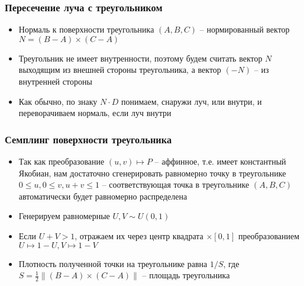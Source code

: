 \documentclass[10pt]{beamer}
\begin{document}
\begin{frame}
\frametitle{Пересечение луча с треугольником}
\begin{itemize}
\item Нормаль к поверхности треугольника \begin{math}(A,B,C)\end{math} -- нормированный вектор \begin{math}N = (B-A)\times(C-A)\end{math}
\pause
\item Треугольник не имеет внутренности, поэтому будем считать вектор \begin{math}N\end{math} выходящим из внешней стороны треугольника, а вектор \begin{math}(-N)\end{math} -- из внутренней стороны
\pause
\item Как обычно, по знаку \begin{math}N\cdot D\end{math} понимаем, снаружи луч, или внутри, и переворачиваем нормаль, если луч внутри
\end{itemize}
\end{frame}

\begin{frame}
\frametitle{Семплинг поверхности треугольника}
\begin{itemize}
\item Так как преобразование \begin{math}(u, v) \mapsto P\end{math} -- аффинное, т.е. имеет константный Якобиан, нам достаточно сгенерировать равномерно точку в треугольнике \begin{math}0\leq u, 0\leq v, u+v \leq 1\end{math} -- соответствующая точка в треугольнике \begin{math}(A,B,C)\end{math} автоматически будет равномерно распределена
\pause
\item Генерируем равномерные \begin{math}U,V \sim U(0,1)\end{math}
\pause
\item Если \begin{math}U+V>1\end{math}, отражаем их через центр квадрата \begin{math}[0,1]\times [0,1]\end{math} преобразованием \begin{math}U \mapsto 1-U, V \mapsto 1-V\end{math}
\pause
\item Плотность полученной точки на треугольнике равна \begin{math}1/S\end{math}, где \begin{math}S = \frac{1}{2}\| (B-A)\times (C-A)\|\end{math} -- площадь треугольника
\end{itemize}
\end{frame}
\end{document}
